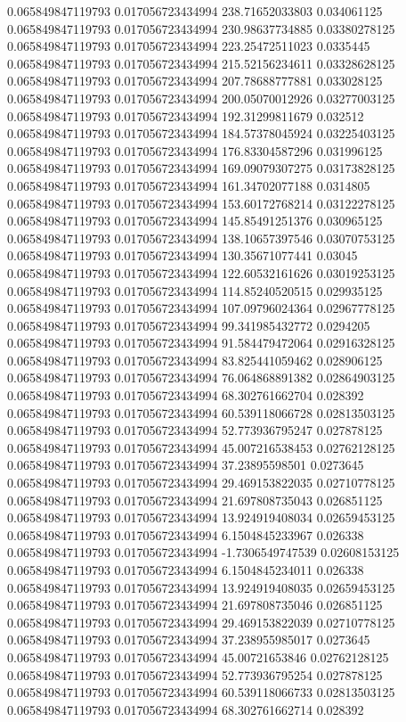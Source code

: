0.065849847119793 0.017056723434994 238.71652033803 0.034061125
0.065849847119793 0.017056723434994 230.98637734885 0.03380278125
0.065849847119793 0.017056723434994 223.25472511023 0.0335445
0.065849847119793 0.017056723434994 215.52156234611 0.03328628125
0.065849847119793 0.017056723434994 207.78688777881 0.033028125
0.065849847119793 0.017056723434994 200.05070012926 0.03277003125
0.065849847119793 0.017056723434994 192.31299811679 0.032512
0.065849847119793 0.017056723434994 184.57378045924 0.03225403125
0.065849847119793 0.017056723434994 176.83304587296 0.031996125
0.065849847119793 0.017056723434994 169.09079307275 0.03173828125
0.065849847119793 0.017056723434994 161.34702077188 0.0314805
0.065849847119793 0.017056723434994 153.60172768214 0.03122278125
0.065849847119793 0.017056723434994 145.85491251376 0.030965125
0.065849847119793 0.017056723434994 138.10657397546 0.03070753125
0.065849847119793 0.017056723434994 130.35671077441 0.03045
0.065849847119793 0.017056723434994 122.60532161626 0.03019253125
0.065849847119793 0.017056723434994 114.85240520515 0.029935125
0.065849847119793 0.017056723434994 107.09796024364 0.02967778125
0.065849847119793 0.017056723434994 99.341985432772 0.0294205
0.065849847119793 0.017056723434994 91.584479472064 0.02916328125
0.065849847119793 0.017056723434994 83.825441059462 0.028906125
0.065849847119793 0.017056723434994 76.064868891382 0.02864903125
0.065849847119793 0.017056723434994 68.302761662704 0.028392
0.065849847119793 0.017056723434994 60.539118066728 0.02813503125
0.065849847119793 0.017056723434994 52.773936795247 0.027878125
0.065849847119793 0.017056723434994 45.007216538453 0.02762128125
0.065849847119793 0.017056723434994 37.23895598501 0.0273645
0.065849847119793 0.017056723434994 29.469153822035 0.02710778125
0.065849847119793 0.017056723434994 21.697808735043 0.026851125
0.065849847119793 0.017056723434994 13.924919408034 0.02659453125
0.065849847119793 0.017056723434994 6.1504845233967 0.026338
0.065849847119793 0.017056723434994 -1.7306549747539 0.02608153125
0.065849847119793 0.017056723434994 6.1504845234011 0.026338
0.065849847119793 0.017056723434994 13.924919408035 0.02659453125
0.065849847119793 0.017056723434994 21.697808735046 0.026851125
0.065849847119793 0.017056723434994 29.469153822039 0.02710778125
0.065849847119793 0.017056723434994 37.238955985017 0.0273645
0.065849847119793 0.017056723434994 45.00721653846 0.02762128125
0.065849847119793 0.017056723434994 52.773936795254 0.027878125
0.065849847119793 0.017056723434994 60.539118066733 0.02813503125
0.065849847119793 0.017056723434994 68.302761662714 0.028392
